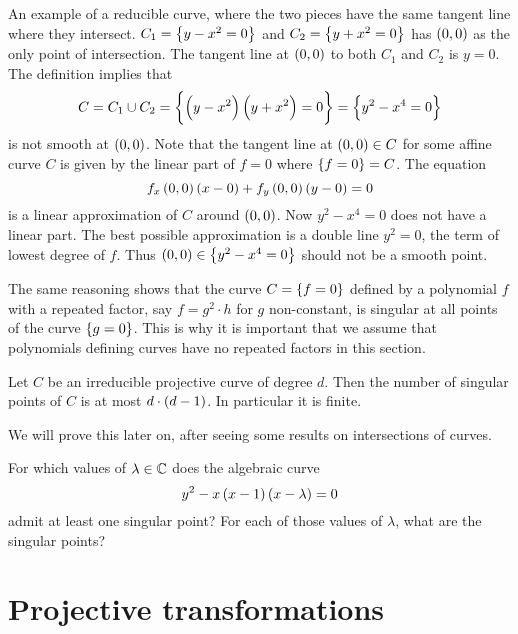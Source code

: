 
\begin{example*}
An example of a reducible curve, where the two pieces have the same tangent line where they intersect. $ C_1 = \cbr{y - x^2 = 0} $ and $ C_2 = \cbr{y + x^2 = 0} $ has $ \br{0, 0} $ as the only point of intersection. The tangent line at $ \br{0, 0} $ to both $ C_1 $ and $ C_2 $ is $ y = 0 $. The definition implies that
$$ C = C_1 \cup C_2 = \cbr{\br{y - x^2}\br{y + x^2} = 0} = \cbr{y^2 - x^4 = 0} $$
is not smooth at $ \br{0, 0} $. Note that the tangent line at $ \br{0, 0} \in C $ for some affine curve $ C $ is given by the linear part of $ f = 0 $ where $ \cbr{f = 0} = C $. The equation
$$ f_x\br{0, 0}\br{x - 0} + f_y\br{0, 0}\br{y - 0} = 0 $$
is a linear approximation of $ C $ around $ \br{0, 0} $. Now $ y^2 - x^4 = 0 $ does not have a linear part. The best possible approximation is a double line $ y^2 = 0 $, the term of lowest degree of $ f $. Thus $ \br{0, 0} \in \cbr{y^2 - x^4 = 0} $ should not be a smooth point.
\end{example*}

\begin{remark}
The same reasoning shows that the curve $ C = \cbr{f = 0} $ defined by a polynomial $ f $ with a repeated factor, say $ f = g^2 \cdot h $ for $ g $ non-constant, is singular at all points of the curve $ \cbr{g = 0} $. This is why it is important that we assume that polynomials defining curves have no repeated factors in this section.
\end{remark}

\begin{theorem}
\label{thm:7.11}
Let $ C $ be an irreducible projective curve of degree $ d $. Then the number of singular points of $ C $ is at most $ d \cdot \br{d - 1} $. In particular it is finite.
\end{theorem}

We will prove this later on, after seeing some results on intersections of curves.

\begin{exercise}
For which values of $ \lambda \in \mathbb{C} $ does the algebraic curve
$$ y^2 - x\br{x - 1}\br{x - \lambda} = 0 $$
admit at least one singular point? For each of those values of $ \lambda $, what are the singular points?
\end{exercise}

\pagebreak

\section{Projective transformations}

